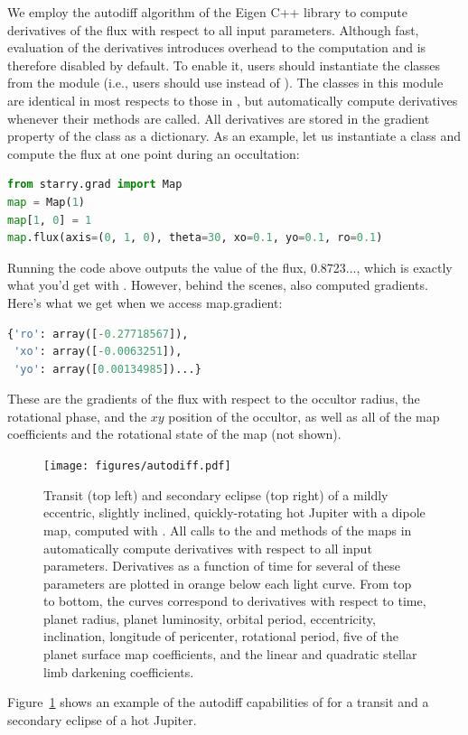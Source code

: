 \documentclass[modern]{aastex61}
\begin{document}
We employ the autodiff algorithm of the Eigen \citep{eigen} C++ library to compute
derivatives of the flux with respect to all input parameters. Although fast,
evaluation of the derivatives introduces overhead to the computation
and is therefore disabled by default. To enable it, users should instantiate the
\starry classes from the \starrygrad module (i.e., users should use
\gradMap instead of \starryMap). The classes in this module are
identical in most respects to those in \starry, but automatically compute derivatives
whenever their methods are called. All derivatives are stored in the \textsf{gradient}
property of the class as a dictionary. As an example, let us instantiate a \gradMap
class and compute the flux at one point during an occultation:
%
\begin{lstlisting}[language=Python,firstnumber=last]
from starry.grad import Map
map = Map(1)
map[1, 0] = 1
map.flux(axis=(0, 1, 0), theta=30, xo=0.1, yo=0.1, ro=0.1)
\end{lstlisting}
%
Running the code above outputs the value of the flux, \textsf{0.8723...},
which is exactly what you'd get with \starryMap. However, behind the scenes,
\starry also computed gradients. Here's what we get when we access \textsf{map.gradient}:
%
\begin{lstlisting}[language=Python,firstnumber=last]
{'ro': array([-0.27718567]),
 'xo': array([-0.0063251]),
 'yo': array([0.00134985])...}
\end{lstlisting}
%
These are the gradients of the flux with respect to the occultor radius,
the rotational phase, and the $xy$ position of the occultor, as well as
all of the map coefficients and the rotational state of the map (not shown).
%
\begin{figure}[p!]
    \begin{centering}
    \texttt{[image: figures/autodiff.pdf]}
    \caption{\label{fig:autodiff}
             Transit (top left) and secondary eclipse (top right) of a mildly
             eccentric, slightly inclined, quickly-rotating hot Jupiter with a
             dipole map, computed with \gradMap. All calls to the \gradflux
             and \gradeval methods of the maps in \starrygrad automatically
             compute derivatives with respect to all input parameters. Derivatives
             as a function of time for several of these parameters are plotted in
             orange below each light curve. From top to bottom, the curves correspond
             to derivatives with respect to time, planet radius, planet luminosity,
             orbital period, eccentricity, inclination, longitude of pericenter,
             rotational period, five of the planet surface map coefficients, and
             the linear and quadratic stellar limb darkening coefficients.
             }
    \end{centering}
\end{figure}
%
Figure~\ref{fig:autodiff} shows an example of the autodiff capabilities of
\starry for a transit and a secondary eclipse of a hot Jupiter.
\end{document}
